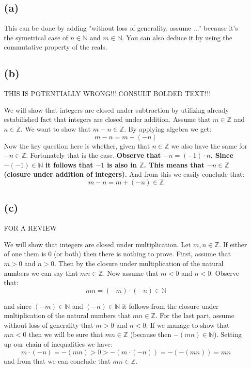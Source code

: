 \documentclass{article}
\begin{document}
\subsection*{(a)}
This can be done by adding "without loss of generality, assume ..." because it's the symetrical case of \(n \in \mathbb{N}\)
and \(m \in \mathbb{N}\). You can also deduce it by using the commutative property of the reals.
\subsection*{(b)}
\begin{center}
    THIS IS POTENTIALLY WRONG!!! CONSULT BOLDED TEXT!!! 
\end{center}
We will show that integers are closed under subtraction by utilizing already estabilished fact that integers
are closed under addition. Assume that \(m \in \mathbb{Z}\) and \(n \in \mathbb{Z}\). We want to show that
\(m - n \in \mathbb{Z}\). By applying algebra we get:
\begin{equation*}
    m - n = m + (-n)
\end{equation*}
Now the key question here is whether, given that \(n \in \mathbb{Z}\) we also have the same for \(-n \in \mathbb{Z}\).
Fortunately that is the case. \textbf{Observe that \(-n = (-1) \cdot n\). Since \(-(-1) \in \mathbb{N}\) it follows that \(-1\) is also in
\(\mathbb{Z}\). This means that \(-n \in \mathbb{Z}\) (closure under addition of integers).} And from this we easily conclude that:
\begin{equation*}
    m - n = m + (-n) \in \mathbb{Z}
\end{equation*}
\subsection*{(c)}
\begin{center}
    FOR A REVIEW
\end{center}
We will show that integers are closed under multiplication. Let \(m, n \in \mathbb{Z}\). If either of one them is \(0\) (or both)
then there is nothing to prove. First, assume that \(m > 0\) and \(n > 0\). Then by the closure under multiplication of the
natural numbers we can say that \(mn \in \mathbb{Z}\). Now assume that \(m < 0\) and \(n < 0\). Observe that:
\begin{equation*}
    mn = (-m) \cdot (-n) \in \mathbb{N}
\end{equation*}

and since \((-m) \in \mathbb{N}\) and \((-n) \in \mathbb{N}\) it follows from the closure under multiplication of the natural numbers
that \(mn \in \mathbb{Z}\). For the last part, assume without loss of generality that \(m > 0\) and \(n < 0\). If we
manage to show that \(mn < 0\) then we will be sure that \(mn \in \mathbb{Z}\) (because then \(-(mn) \in \mathbb{N}\)).
Setting up our chain of inequalities we have:
\begin{equation*}
    m \cdot (-n) = -(mn) > 0 > - (m \cdot (-n)) = - (-(mn)) = mn
\end{equation*}
and from that we can conclude that \(mn \in \mathbb{Z}\).
\end{document}
